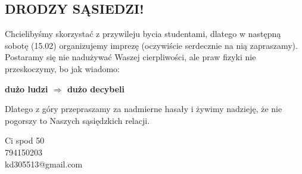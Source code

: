 \documentclass[12pt]{article}
\begin{document}
\begin{center}
    {\section*{DRODZY SĄSIEDZI!}}
\end{center}

Chcielibyśmy skorzystać z przywileju bycia studentami, dlatego w następną sobotę (15.02) organizujemy imprezę (oczywiście serdecznie na nią zapraszamy).
Postaramy się nie nadużywać Waszej cierpliwości, ale praw fizyki nie przeskoczymy, bo jak wiadomo:
\begin{center}
    \vspace{2em}
    \textbf{dużo ludzi $\Rightarrow$ dużo decybeli}
\end{center}
\vspace{1.5em}
Dlatego z góry przepraszamy za nadmierne hasały i żywimy nadzieję, że nie pogorszy to Naszych sąsiędzkich relacji.
\begin{flushright}
    Ci spod 50\\
    794150203\\
    kd305513@gmail.com
\end{flushright}
\end{document}
